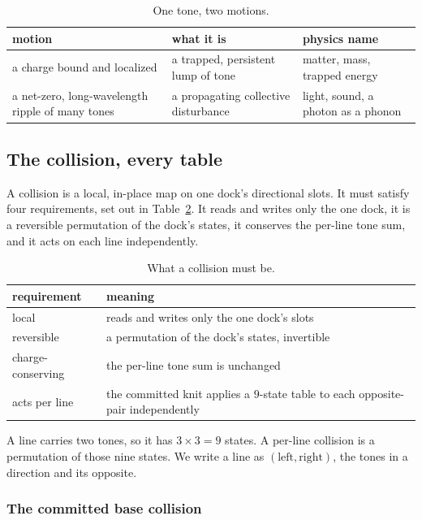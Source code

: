 \begin{table}[ht]
\centering
\begin{tabular}{@{}lll@{}}
\toprule
motion & what it is & physics name \\
\midrule
a charge bound and localized & a trapped, persistent lump of tone & matter, mass, trapped energy \\
a net-zero, long-wavelength ripple of many tones & a propagating collective disturbance & light, sound, a photon as a phonon \\
\bottomrule
\end{tabular}
\caption{One tone, two motions.}
\label{tab:motions}
\end{table}

\subsection{The collision, every table}

A collision is a local, in-place map on one dock's directional slots. It must satisfy four requirements, set out in Table~\ref{tab:requirements}. It reads and writes only the one dock, it is a reversible permutation of the dock's states, it conserves the per-line tone sum, and it acts on each line independently.

\begin{table}[ht]
\centering
\begin{tabular}{@{}ll@{}}
\toprule
requirement & meaning \\
\midrule
local & reads and writes only the one dock's slots \\
reversible & a permutation of the dock's states, invertible \\
charge-conserving & the per-line tone sum is unchanged \\
acts per line & the committed knit applies a $9$-state table to each opposite-pair independently \\
\bottomrule
\end{tabular}
\caption{What a collision must be.}
\label{tab:requirements}
\end{table}

A line carries two tones, so it has $3 \times 3 = 9$ states. A per-line collision is a permutation of those nine states. We write a line as $(\text{left}, \text{right})$, the tones in a direction and its opposite.

\subsubsection{The committed base collision}

